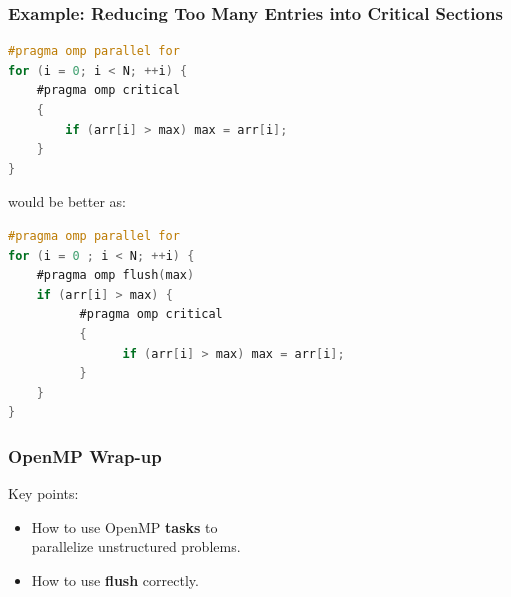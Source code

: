 \begin{frame}[fragile]
  \frametitle{Example: Reducing Too Many Entries into Critical Sections}

  \large
  \begin{lstlisting}[language=C,morekeywords={foreach,pragma,omp,parallel,single,nowait,task,untied,barrier,taskyield,mergeable,final,taskwait,critical}]
#pragma omp parallel for
for (i = 0; i < N; ++i) { 
    #pragma omp critical
    {
        if (arr[i] > max) max = arr[i];
    } 
}
  \end{lstlisting}

would be better as:

  \begin{lstlisting}[language=C,morekeywords={foreach,pragma,omp,parallel,single,nowait,task,untied,barrier,taskyield,mergeable,final,taskwait,critical}]
#pragma omp parallel for
for (i = 0 ; i < N; ++i) { 
    #pragma omp flush(max)
    if (arr[i] > max) {
          #pragma omp critical
          {
                if (arr[i] > max) max = arr[i];
          }
    }
}
  \end{lstlisting}
  
\end{frame}

\begin{frame}
  \frametitle{OpenMP Wrap-up}

\Large
    Key points:\\
  \begin{itemize}
    \item How to use OpenMP {\bf tasks} to\\ \hspace*{2em} parallelize unstructured problems.
    \item How to use {\bf flush} correctly.
  \end{itemize}
  
\end{frame}

